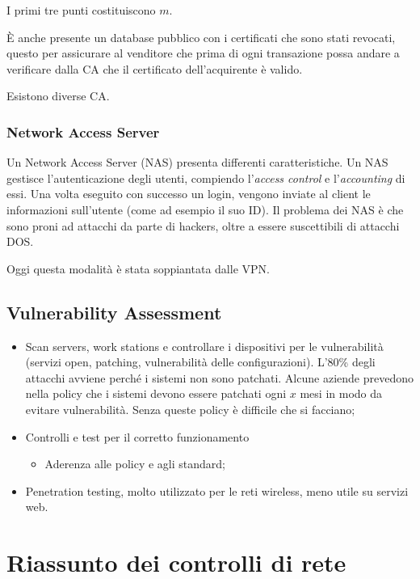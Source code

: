 I primi tre punti costituiscono $m$.

È anche presente un database pubblico con i certificati che sono stati
revocati, questo per assicurare al venditore che prima di ogni transazione
possa andare a verificare dalla CA che il certificato dell'acquirente è valido.

Esistono diverse CA.


\subsubsection{Network Access Server}

Un Network Access Server (NAS) presenta differenti caratteristiche. Un NAS gestisce
l'autenticazione degli utenti, compiendo l'\textit{access control} e
l'\textit{accounting} di essi. Una volta eseguito con successo un login,
vengono inviate al client le informazioni sull'utente (come ad esempio il suo
ID). Il problema dei NAS è che sono proni ad attacchi da parte di hackers,
oltre a essere suscettibili di attacchi DOS.

Oggi questa modalità è stata soppiantata dalle VPN.

\subsection{Vulnerability Assessment}

\begin{itemize}
\item Scan servers, work stations e controllare i dispositivi per le
vulnerabilità (servizi open, patching, vulnerabilità delle configurazioni).
L'80\% degli attacchi avviene perché i sistemi non sono patchati. Alcune
aziende prevedono nella policy che i sistemi devono essere patchati ogni $x$
mesi in modo da evitare vulnerabilità. Senza queste policy è difficile che si
facciano;
\item Controlli e test per il corretto funzionamento
\begin{itemize}
 \item Aderenza alle policy e agli standard;
\end{itemize}
\item Penetration testing, molto utilizzato per le reti wireless, meno utile su
servizi web.
\end{itemize}

\section{Riassunto dei controlli di rete}

